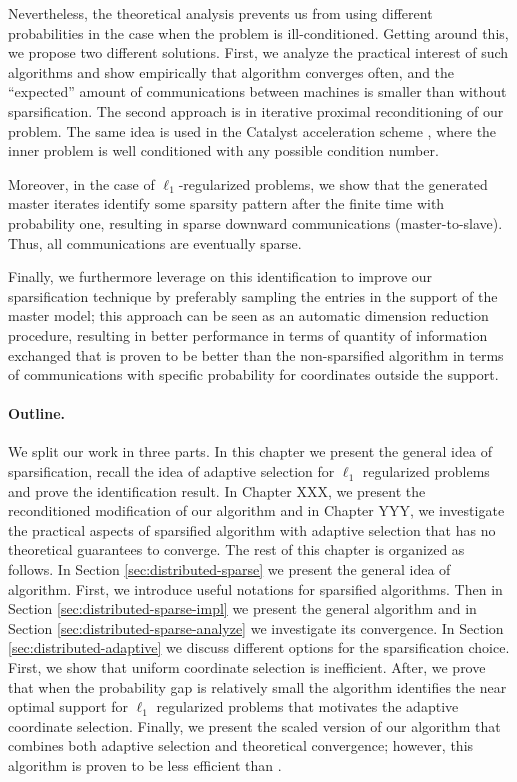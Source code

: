 {Nevertheless, the theoretical analysis prevents us from using different probabilities in the case when the problem is ill-conditioned. Getting around this, we propose two different solutions. First, we analyze the practical interest of such algorithms and show empirically that algorithm converges often, and the ``expected'' amount of communications between machines is smaller than without sparsification. The second approach is in iterative proximal reconditioning of our problem. The same idea is used in the Catalyst acceleration scheme \cite{lin2015universal}, where the inner problem is well conditioned with any possible condition number.

Moreover, in the case of $\ell_1$-regularized problems, we show that the generated master iterates identify some sparsity pattern after the finite time with probability one, resulting in sparse downward communications (master-to-slave). Thus, all communications are eventually sparse. 

Finally, we furthermore leverage on this identification to improve our sparsification technique by preferably sampling the entries in the support of the master model; 
this approach can be seen as an automatic dimension reduction procedure, resulting in better performance in terms of quantity of information exchanged {{that is proven to be better than the non-sparsified algorithm in terms of communications with specific probability for coordinates outside the support.}}
\paragraph{Outline.}

We split our work in three parts. In this chapter we present the general idea of sparsification, recall the idea of adaptive selection for $\ell_1$ regularized problems and prove the identification result. In Chapter XXX, we present the reconditioned modification of our algorithm and in Chapter YYY, we investigate the practical aspects of sparsified algorithm with adaptive selection that has no theoretical guarantees to converge. The rest of this chapter is organized as follows. In Section \ref{sec:distributed-sparse} we present the general idea of \salgo algorithm. First, we introduce useful notations for sparsified algorithms. Then in Section \ref{sec:distributed-sparse-impl} we present the general algorithm and in Section \ref{sec:distributed-sparse-analyze} we investigate its convergence. In Section \ref{sec:distributed-adaptive} we discuss different options for the sparsification choice. First, we show that uniform coordinate selection is inefficient. After, we prove that when the probability gap is relatively small the algorithm identifies the near optimal support for $\ell_1$ regularized problems that motivates the adaptive coordinate selection. Finally, we present the scaled version of our algorithm \maskalgo that combines both adaptive selection and theoretical convergence; however, this algorithm is proven to be less efficient than \dave.
}


